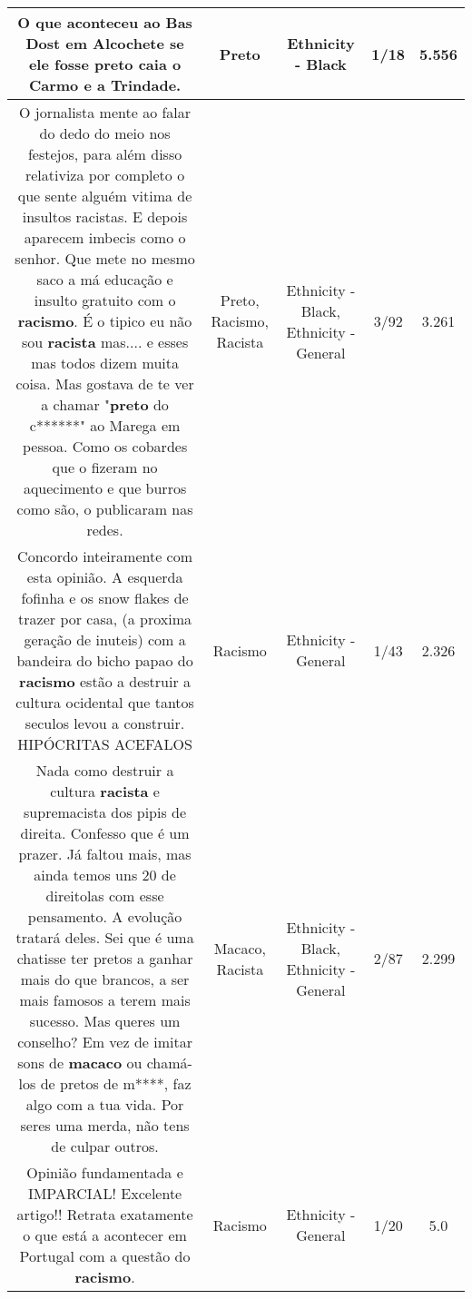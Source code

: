 \documentclass[11pt]{article}
\newlength\mylength
\begin{document}
\begin{center}
\begin{longtable}{|C{.65\mylength}|C{.30\mylength}|C{.12\mylength}|C{.12\mylength}|C{.12\mylength}|}
  \small O que aconteceu ao Bas Dost em Alcochete se ele fosse \textbf{preto} caia o Carmo e a Trindade.\normalsize   & Preto & Ethnicity - Black & 1/18 & 5.556 \\  \hline
  \small O jornalista mente ao falar do dedo do meio nos festejos, para além disso relativiza por completo o que sente alguém vitima de insultos racistas. E depois aparecem imbecis como o senhor. Que mete no mesmo saco a má educação e insulto gratuito com o \textbf{racismo}. É o tipico eu não sou \textbf{racista} mas.... e esses mas todos dizem muita coisa. Mas gostava de te ver a chamar "\textbf{preto} do c******" ao Marega em pessoa. Como os cobardes que o fizeram no aquecimento e que burros como são, o publicaram nas redes.\normalsize   & Preto, Racismo, Racista & Ethnicity - Black, Ethnicity - General & 3/92 & 3.261 \\  \hline
  \small Concordo inteiramente com esta opinião. A esquerda fofinha e os snow flakes de trazer por casa, (a proxima geração de inuteis) com a bandeira do bicho papao do \textbf{racismo} estão a destruir a cultura ocidental que tantos seculos levou a construir. HIPÓCRITAS ACEFALOS\normalsize   & Racismo & Ethnicity - General & 1/43 & 2.326 \\  \hline
  \small Nada como destruir a cultura \textbf{racista} e supremacista dos pipis de direita. Confesso que é um prazer. Já faltou mais, mas ainda temos uns 20 de direitolas com esse pensamento. A evolução tratará deles. Sei que é uma chatisse ter pretos a ganhar mais do que brancos, a ser mais famosos a terem mais sucesso. Mas queres um conselho? Em vez de imitar sons de \textbf{macaco} ou chamá-los de pretos de m****, faz algo com a tua vida. Por seres uma merda, não tens de culpar outros.\normalsize   & Macaco, Racista & Ethnicity - Black, Ethnicity - General & 2/87 & 2.299 \\  \hline
  \small Opinião fundamentada e IMPARCIAL! Excelente artigo!! Retrata exatamente o que está a acontecer em Portugal com a questão do \textbf{racismo}.\normalsize   & Racismo & Ethnicity - General & 1/20 & 5.0 \\  \hline

\end{longtable}
\end{center}
\end{document}

